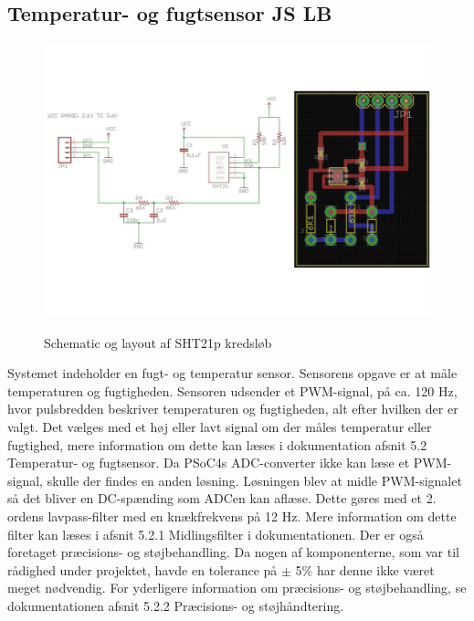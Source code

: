 \subsection{Temperatur- og fugtsensor JS LB}


\begin{figure}[htb]
\centering
{\includegraphics[width=\textwidth]{billeder/SHT_pcb}}
\caption{Schematic og layout af SHT21p kredsl\o{}b}
\label{lab:SHT21p-kredsloeb}
\end{figure}

Systemet indeholder  en fugt- og temperatur sensor. Sensorens opgave er at måle temperaturen og fugtigheden.
Sensoren udsender et PWM-signal, på ca. 120 Hz, hvor pulsbredden beskriver temperaturen og fugtigheden,  alt efter hvilken der er valgt. Det vælges med et høj eller lavt signal om der måles temperatur eller fugtighed, mere information om dette kan læses i dokumentation afsnit 5.2 Temperatur- og fugtsensor.
Da PSoC4s ADC-converter ikke kan læse et PWM-signal, skulle der findes en anden løsning. Løsningen blev at midle PWM-signalet så det bliver en DC-spænding som ADCen kan aflæse. Dette gøres med et 2. ordens lavpass-filter med en knækfrekvens på 12 Hz. Mere information om dette filter kan læses i afsnit 5.2.1 Midlingsfilter i dokumentationen. 
Der er også foretaget præcisions- og støjbehandling. Da nogen af komponenterne, som var til rådighed under projektet, havde en tolerance på $\pm$ 5\% har denne ikke været meget nødvendig. For yderligere information om præcisions- og støjbehandling, se dokumentationen afsnit 5.2.2 Præcisions- og støjhåndtering. 
